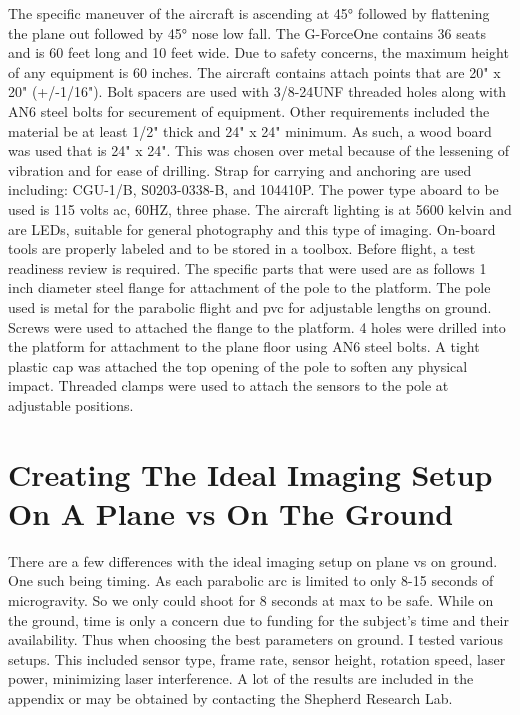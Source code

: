 The specific maneuver of the aircraft is ascending at \ang{45} followed by flattening the plane out followed by \ang{45} nose low fall. The G-ForceOne contains 36 seats and is 60 feet long and 10 feet wide. Due to safety concerns, the maximum height of any equipment is 60 inches. The aircraft contains attach points that are 20" x 20" (+/-1/16"). Bolt spacers are used with 3/8-24UNF threaded holes along with AN6 steel bolts for securement of equipment. Other requirements included the material be at least 1/2" thick and 24" x 24" minimum. As such, a wood board was used that is 24" x 24". This was chosen over metal because of the lessening of vibration and for ease of drilling. Strap for carrying and anchoring are used including: CGU-1/B, S0203-0338-B, and 104410P. The power type aboard to be used is 115 volts ac, 60HZ, three phase. The aircraft lighting is at 5600 kelvin and are LEDs, suitable for general photography and this type of imaging. On-board tools are properly labeled and to be stored in a toolbox. Before flight, a test readiness review is required.
The specific parts that were used are as follows 1 inch diameter steel flange for attachment of the pole to the platform. The pole used is metal for the parabolic flight and pvc for adjustable lengths on ground. Screws were used to attached the flange to the platform. 4 holes were drilled into the platform for attachment to the plane floor using AN6 steel bolts. A tight plastic cap was attached the top opening of the pole to soften any physical impact. Threaded clamps were used to attach the sensors to the pole at adjustable positions.

\section{Creating The Ideal Imaging Setup On A Plane vs On The Ground}
There are a few differences with the ideal imaging setup on plane vs on ground. One such being timing. As each parabolic arc is limited to only 8-15 seconds of microgravity. So we only could shoot for 8 seconds at max to be safe. While on the ground, time is only a concern due to funding for the subject's time and their availability. Thus when choosing the best parameters on ground. I tested various setups. This included sensor type, frame rate, sensor height, rotation speed, laser power, minimizing laser interference. A lot of the results are included in the appendix or may be obtained by contacting the Shepherd Research Lab.
